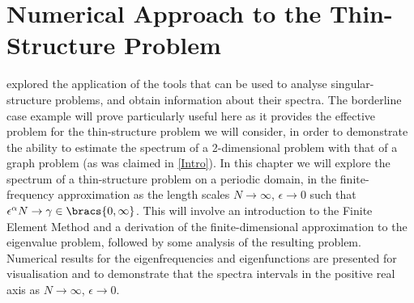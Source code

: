 \chapter{Numerical Approach to the Thin-Structure Problem} \label{ch:Homogenisation}
 explored the application of the tools that can be used to analyse singular-structure problems, and obtain information about their spectra.
The borderline case example will prove particularly useful here as it provides the effective problem for the thin-structure problem we will consider, in order to demonstrate the ability to estimate the spectrum of a 2-dimensional problem with that of a graph problem (as was claimed in \cref{Intro}).
In this chapter we will explore the spectrum of a thin-structure problem on a periodic domain, in the finite-frequency approximation as the length scales $N\rightarrow\infty$, $\epsilon\rightarrow0$ such that $\epsilon^{\alpha}N\rightarrow\gamma\in\bracs{0,\infty}$.
This will involve an introduction to the Finite Element Method and a derivation of the finite-dimensional approximation to the eigenvalue problem, followed by some analysis of the resulting problem.
Numerical results for the eigenfrequencies and eigenfunctions are presented for visualisation and to demonstrate that the spectra  intervals in the positive real axis as $N\rightarrow\infty$, $\epsilon\rightarrow0$.

